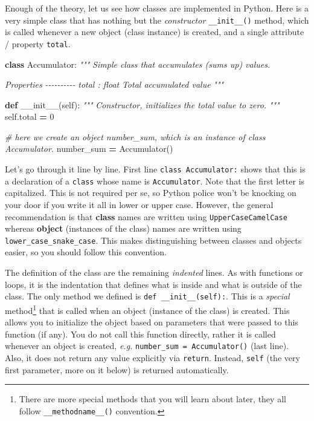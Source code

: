 \documentclass[
]{book}
\newenvironment{Shaded}{\begin{snugshade}}{\end{snugshade}}
\newcommand{\CommentTok}[1]{\textcolor[rgb]{0.56,0.35,0.01}{\textit{#1}}}
\newcommand{\DecValTok}[1]{\textcolor[rgb]{0.00,0.00,0.81}{#1}}
\newcommand{\FunctionTok}[1]{\textcolor[rgb]{0.00,0.00,0.00}{#1}}
\newcommand{\KeywordTok}[1]{\textcolor[rgb]{0.13,0.29,0.53}{\textbf{#1}}}
\newcommand{\NormalTok}[1]{#1}
\newcommand{\OperatorTok}[1]{\textcolor[rgb]{0.81,0.36,0.00}{\textbf{#1}}}
\newcommand{\VariableTok}[1]{\textcolor[rgb]{0.00,0.00,0.00}{#1}}
\begin{document}
Enough of the theory, let us see how classes are implemented in Python. Here is a very simple class that has nothing but the \emph{constructor} \texttt{\_\_init\_\_()} method, which is called whenever a new object (class instance) is created, and a single attribute / property \texttt{total}.

\begin{Shaded}
\begin{Highlighting}[]
\KeywordTok{class}\NormalTok{ Accumulator:}
    \CommentTok{"""}
\CommentTok{    Simple class that accumulates (sums up) values.}

\CommentTok{    Properties}
\CommentTok{    {-}{-}{-}{-}{-}{-}{-}{-}{-}{-}}
\CommentTok{    total : float}
\CommentTok{        Total accumulated value}
\CommentTok{    """}

    \KeywordTok{def} \FunctionTok{\_\_init\_\_}\NormalTok{(}\VariableTok{self}\NormalTok{):}
        \CommentTok{"""}
\CommentTok{        Constructor, initializes the total value to zero.}
\CommentTok{        """}
        \VariableTok{self}\NormalTok{.total }\OperatorTok{=} \DecValTok{0}
        
\CommentTok{\# here we create an object number\_sum, which is an instance of class Accumulator.}
\NormalTok{number\_sum }\OperatorTok{=}\NormalTok{ Accumulator()}
\end{Highlighting}
\end{Shaded}

Let's go through it line by line. First line \texttt{class\ Accumulator:} shows that this is a declaration of a \texttt{class} whose name is \texttt{Accumulator}. Note that the first letter is capitalized. This is not required per se, so Python police won't be knocking on your door if you write it all in lower or upper case. However, the general recommendation is that \textbf{class} names are written using \texttt{UpperCaseCamelCase} whereas \textbf{object} (instances of the class) names are written using \texttt{lower\_case\_snake\_case}. This makes distinguishing between classes and objects easier, so you should follow this convention.

The definition of the class are the remaining \emph{indented} lines. As with functions or loops, it is the indentation that defines what is inside and what is outside of the class. The only method we defined is \texttt{def\ \_\_init\_\_(self):}. This is a \emph{special} method\footnote{There are more special methods that you will learn about later, they all follow \texttt{\_\_methodname\_\_()} convention.} that is called when an object (instance of the class) is created. This allows you to initialize the object based on parameters that were passed to this function (if any). You do not call this function directly, rather it is called whenever an object is created, \emph{e.g.} \texttt{number\_sum\ =\ Accumulator()} (last line). Also, it does not return any value explicitly via \texttt{return}. Instead, \texttt{self} (the very first parameter, more on it below) is returned automatically.
\end{document}
